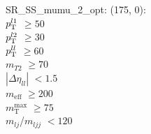 SR\_SS\_mumu\_2\_opt: (175, 0): \\
$p_{\text{T}}^{l1}$ $\geq 50$ \\
$p_{\text{T}}^{l2}$ $\geq 30$ \\
$p_{\text{T}}^{ll}$ $\geq 60$ \\
$m_{T2}$ $\geq 70$ \\
$|\Delta\eta_{ll}|$ $<1.5$ \\
$m_{\text{eff}}$ $\geq 200$ \\
$m_{\text{T}}^{\text{max}}$ $\geq 75$ \\
$m_{lj}$/$m_{ljj}$ $<120$ \\
